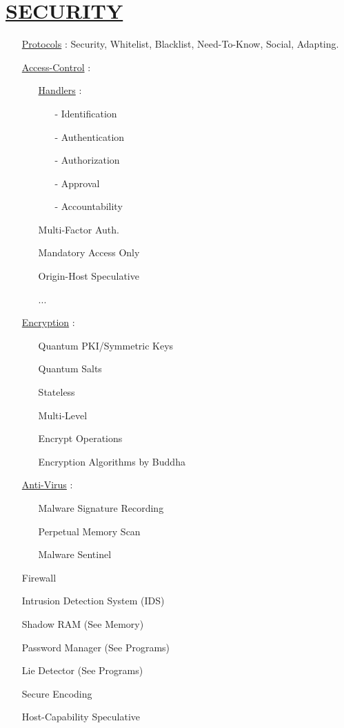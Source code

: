 \documentclass[11pt]{article}
\begin{document}
\section*{\ul{SECURITY}}
\begin{enumerate}
	\item[] \ul{Protocols} : Security, Whitelist, Blacklist, Need-To-Know, Social, Adapting.
	
	\item[] \ul{Access-Control} :
	\begin{enumerate}
		\item[] \ul{Handlers} :
		\begin{enumerate}
			\item[-] Identification
			\item[-] Authentication
			\item[-] Authorization
			\item[-] Approval
			\item[-] Accountability
		\end{enumerate}
		\item[] Multi-Factor Auth.
		\item[] Mandatory Access Only
		\item[] Origin-Host Speculative
		\item[] ...
	\end{enumerate}
	
	\item[] \ul{Encryption} :
	\begin{enumerate}
		\item[] Quantum PKI/Symmetric Keys
		\item[] Quantum Salts
		\item[] Stateless
		\item[] Multi-Level
		\item[] Encrypt Operations
		\item[] Encryption Algorithms by Buddha
	\end{enumerate}
	
	\item[] \ul{Anti-Virus} :
	\begin{enumerate}
		\item[] Malware Signature Recording
		\item[] Perpetual Memory Scan
		\item[] Malware Sentinel
	\end{enumerate}

	\item[] Firewall
	\item[] Intrusion Detection System (IDS)
	\item[] Shadow RAM (See Memory)
	\item[] Password Manager (See Programs)
	\item[] Lie Detector (See Programs)
	\item[] Secure Encoding
	\item[] Host-Capability Speculative
\end{enumerate}
\end{document}

